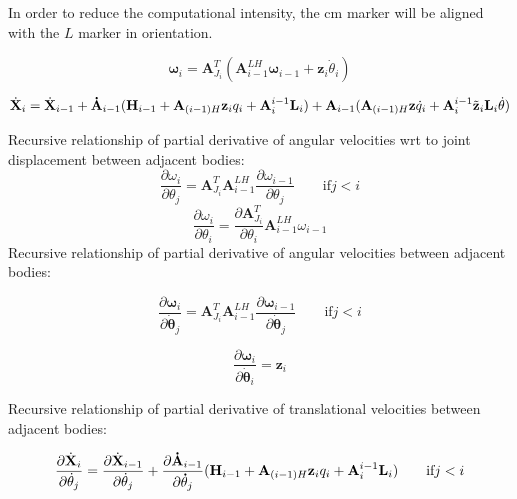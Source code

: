\documentclass{article}
\begin{document}
In order to reduce the computational intensity, the cm marker will be aligned with the $L$ marker in orientation. 

\begin{equation}
	\mathbf{\omega}_i = \mathbf{A}^{T}_{J_i}(\mathbf{A}^{LH}_{i-1}\mathbf{\omega}_{i-1}+\mathbf{z}_i\dot{\theta}_i) 
\end{equation}


\begin{equation}
	\dot{\mathbf X}_i=\dot{\mathbf X}_{i-1} + 
	\mathbf{\dot A}_{i-1}(\mathbf{H}_{i-1}+\mathbf{A}_{(i-1)H}\mathbf{z}_iq_i+\mathbf{A}^{i-1}_i\mathbf{L}_i) +  \\
        \mathbf{A}_{i-1}(\mathbf{A}_{(i-1)H}\mathbf{z}\dot{q}_i+\mathbf{A}^{i-1}_i\tilde{\mathbf z}_i\mathbf{L}_i\dot{\theta})
\end{equation}

Recursive  relationship of partial derivative of angular velocities wrt to joint displacement between adjacent bodies:
\begin{equation}
\frac{\partial \omega_i}{\partial \theta_j}= 
\mathbf{A}^T_{J_i}\mathbf{A}^{LH}_{i-1}\frac{\partial \omega_{i-1}}{\partial \theta_j}
	\qquad \textrm{if} j < i
\end{equation}
\begin{equation}
\frac{\partial \omega_i}{\partial \theta_i} 
= \frac{\partial \mathbf{A}^T_{J_i}}{\partial \theta_i}
\mathbf{A}_{i-1}^{LH}\omega_{i-1}
\end{equation}
Recursive  relationship of partial derivative of angular velocities between adjacent bodies:

\begin{equation}
\frac{\partial \mathbf{\omega}_i}{\partial {\mathbf{\dot \theta}_j}} = 
{\mathbf A}^T_{J_i}\mathbf{A}^{LH}_{i-1}\frac{\partial \mathbf{\omega}_{i-1}}{\partial {\mathbf{\dot \theta}_j}}  
	\qquad \textrm{if} j < i
\end{equation}

\begin{equation}
\frac{\partial \mathbf{\omega}_i}{\partial {\mathbf{\dot \theta}_i}} = 
{\mathbf z}_i  
\end{equation}


Recursive  relationship of partial derivative of translational velocities between adjacent bodies:

\begin{equation}
\frac{\partial \dot{\mathbf X}_i}{\partial \dot{\mathbf \theta}_j}=\frac{\partial \dot{\mathbf X}_{i-1}}{\partial \dot{\mathbf \theta}_j} + \\
	\frac{\partial \mathbf{\dot A}_{i-1}}{\partial \mathbf{\dot \theta}_j }(\mathbf{H}_{i-1}+\mathbf{A}_{(i-1)H}\mathbf{z}_iq_i+\mathbf{A}^{i-1}_i\mathbf{L}_i) 
	\qquad \textrm{if} j < i
\end{equation}
\end{document}
